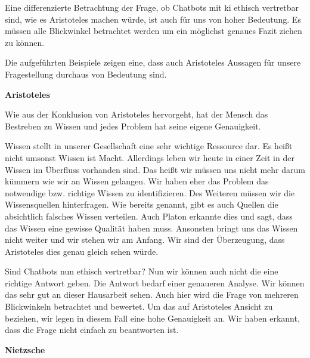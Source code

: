 Eine differenzierte Betrachtung der Frage, ob Chatbots mit \ac{ki} ethisch vertretbar sind, wie es Aristoteles machen würde, ist auch für uns von hoher Bedeutung. Es müssen alle Blickwinkel betrachtet werden um ein möglichst genaues Fazit ziehen zu können.
 
Die aufgeführten Beispiele zeigen eine, dass auch Aristoteles Aussagen für unsere Fragestellung durchaus von Bedeutung sind. 

\textbf{Aristoteles}

Wie aus der Konklusion von Aristoteles hervorgeht, hat der Mensch das Bestreben zu Wissen und jedes Problem hat seine eigene Genauigkeit.

Wissen stellt in unserer Gesellschaft eine sehr wichtige Ressource dar. Es heißt nicht umsonst \glqq Wissen ist Macht\grqq. Allerdings leben wir heute in einer Zeit in der Wissen im Überfluss vorhanden sind. Das heißt wir müssen uns nicht mehr darum kümmern wie wir an Wissen gelangen. Wir haben eher das Problem das notwendige bzw. richtige Wissen zu identifizieren. Des Weiteren müssen wir die Wissensquellen hinterfragen. Wie bereits genannt, gibt es auch Quellen die absichtlich falsches Wissen verteilen. Auch Platon erkannte dies und sagt, dass das Wissen eine gewisse Qualität haben muss. Ansonsten bringt uns das Wissen nicht weiter und wir stehen wir am Anfang. Wir sind der Überzeugung, dass Aristoteles dies genau gleich sehen würde.  

Sind Chatbots nun ethisch vertretbar? Nun wir können auch nicht die eine richtige Antwort geben. Die Antwort bedarf einer genaueren Analyse. Wir können das sehr gut an dieser Hausarbeit sehen. Auch hier wird die Frage von mehreren Blickwinkeln betrachtet und bewertet. Um das auf Aristoteles Ansicht zu beziehen, wir legen in diesem Fall eine hohe Genauigkeit an. Wir haben erkannt, dass die Frage nicht einfach zu beantworten ist. 




\textbf{Nietzsche}





